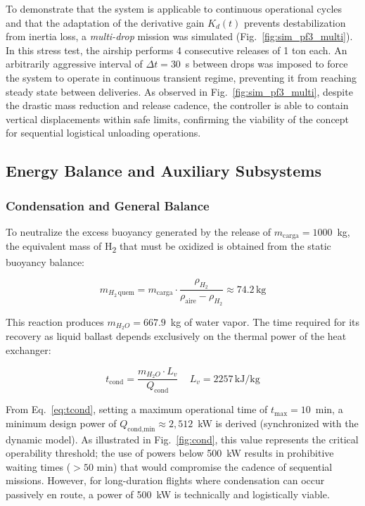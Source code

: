 \documentclass[aerospace,article,submit,pdftex,moreauthors]{Definitions/mdpi}
\begin{document}
To demonstrate that the system is applicable to continuous operational cycles and that the adaptation of the derivative gain $K_d(t)$ prevents destabilization from inertia loss, a \emph{multi-drop} mission was simulated (Fig.~\ref{fig:sim_pf3_multi}). In this stress test, the airship performs 4 consecutive releases of 1 ton each. An arbitrarily aggressive interval of $\Delta t = 30$~s between drops was imposed to force the system to operate in continuous transient regime, preventing it from reaching steady state between deliveries. As observed in Fig.~\ref{fig:sim_pf3_multi}, despite the drastic mass reduction and release cadence, the controller is able to contain vertical displacements within safe limits, confirming the viability of the concept for sequential logistical unloading operations.

\subsection{Energy Balance and Auxiliary Subsystems}

\subsubsection{Condensation and General Balance}
To neutralize the excess buoyancy generated by the release of $m_\text{carga} = 1000$~kg, the equivalent mass of H\textsubscript{2} that must be oxidized is obtained from the static buoyancy balance:

\begin{equation}
m_{H_2\,\text{quem}} = m_\text{carga} \cdot \frac{\rho_{H_2}}{\rho_\text{aire} - \rho_{H_2}} \approx 74.2\,\text{kg}
\label{eq:mh2quem}
\end{equation}

This reaction produces $m_{H_2O} = 667.9$~kg of water vapor. The time required for its recovery as liquid ballast depends exclusively on the thermal power of the heat exchanger:

\begin{equation}
t_\text{cond} = \frac{m_{H_2O}\cdot L_v}{Q_\text{cond}}\, \quad L_v = 2257\,\text{kJ/kg}
\label{eq:tcond}
\end{equation}

From Eq.~\eqref{eq:tcond}, setting a maximum operational time of $t_\text{max}=10$~min, a minimum design power of $Q_\text{cond,min} \approx 2{,}512$~kW is derived (synchronized with the dynamic model). As illustrated in Fig.~\ref{fig:cond}, this value represents the critical operability threshold; the use of powers below 500~kW results in prohibitive waiting times ($>50$ min) that would compromise the cadence of sequential missions. However, for long-duration flights where condensation can occur passively en route, a power of 500~kW is technically and logistically viable.
\end{document}
